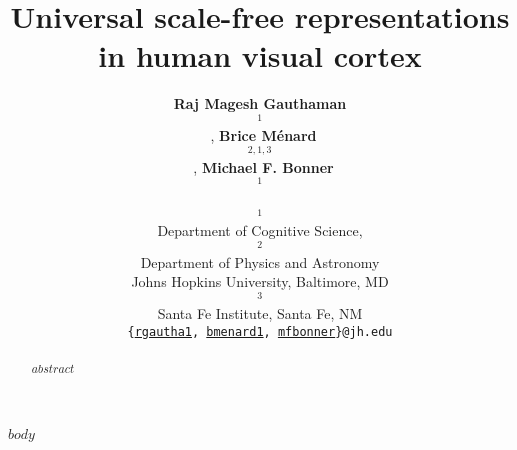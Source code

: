 \documentclass[10pt]{article}
\title{Universal scale-free representations\\in human visual cortex}
\author{
    \textbf{Raj Magesh Gauthaman$$^1$$}~\orcidlink{0000-0001-7121-1532},
    \textbf{Brice Ménard$$^{2,1,3}$$}~\orcidlink{0000-0003-3164-6974},
    \textbf{Michael F. Bonner$$^1$$}~\orcidlink{0000-0002-4992-674X}\\
    $$^1$$Department of Cognitive Science,
    $$^2$$Department of Physics and Astronomy\\
    Johns Hopkins University, Baltimore, MD\\
    $$^3$$Santa Fe Institute, Santa Fe, NM\\
    \texttt{\{\href{mailto:rgautha1@jh.edu}{rgautha1}, \href{mailto:bmenard1@jh.edu}{bmenard1}, \href{mailto:mfbonner@jh.edu}{mfbonner}\}@jh.edu}
}
\date{}
\begin{document}
\maketitle

\begin{abstract}
    $abstract$
\end{abstract}

$body$

\newpage
\printbibliography
\end{document}
